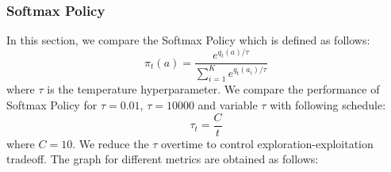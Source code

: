 \documentclass{article}
\begin{document}
		
		\subsubsection{Softmax Policy}
		
		In this section, we compare the Softmax Policy which is defined as follows:
		\begin{equation}
		\nonumber
			\pi_{t}(a) = \frac{e^{q_{t}(a)/\tau}}{\sum_{i=1}^{K} e^{q_{t}(a_{i})/\tau}}
		\end{equation}
		where $\tau$ is the temperature hyperparameter. We compare the performance of Softmax Policy for $\tau=0.01$, $\tau=10000$ and variable $\tau$ with following
		schedule:
		\begin{equation}
		\nonumber
			\tau_{t} = \frac{C}{t}
		\end{equation}
		where $C=10$. We reduce the $\tau$ overtime to control exploration-exploitation tradeoff. The graph for different metrics are obtained as follows:
		
\end{document}
